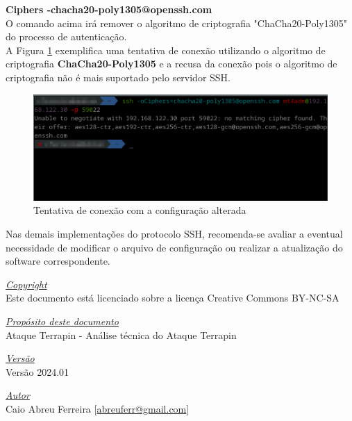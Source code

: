 \documentclass[12pt]{article}
\begin{document}
\textbf{Ciphers -chacha20-poly1305@openssh.com}\\

O comando acima irá remover o algoritmo de criptografia "ChaCha20-Poly1305" do processo de autenticação.\\

A Figura \ref{fig:terrapin_depois} exemplifica uma tentativa de conexão utilizando o algoritmo de criptografia \textbf{ChaCha20-Poly1305} e a recusa da conexão pois o algoritmo de criptografia não é mais suportado pelo servidor SSH.

\begin{figure}[H]
	\centering
	\includegraphics[scale=0.63]{terrapin_depois.png}
	\caption{Tentativa de conexão com a configuração alterada}
	\label{fig:terrapin_depois}
\end{figure}

Nas demais implementações do protocolo SSH, recomenda-se avaliar a eventual necessidade de modificar o arquivo de configuração ou realizar a atualização do software correspondente.

\pagebreak

\vspace*{\fill}
\begin{flushright}
	\underline{\textit{Copyright}}\\
	Este documento está licenciado sobre a licença Creative Commons BY-NC-SA\bigskip

	\underline{\textit{Propósito deste documento}}\\
	Ataque Terrapin - Análise técnica do Ataque Terrapin\bigskip

	\underline{\textit{Versão}}\\
	Versão 2024.01\bigskip

	\underline{\textit{Autor}}\\
	Caio Abreu Ferreira [\href{mailto:abreuferr@gmail.com}{abreuferr@gmail.com}] \bigskip\\
\end{flushright}
\end{document}
